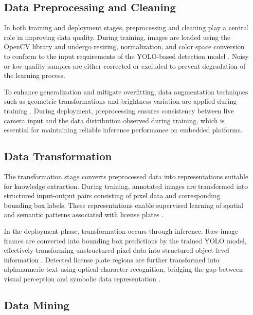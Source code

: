 \subsection{Data Preprocessing and Cleaning}

In both training and deployment stages, preprocessing and cleaning play a central role in improving data quality. During training, images are loaded using the OpenCV library and undergo resizing, normalization, and color space conversion to conform to the input requirements of the YOLO-based detection model \cite{bradski2000opencv,opencv_wiki}. Noisy or low-quality samples are either corrected or excluded to prevent degradation of the learning process.

To enhance generalization and mitigate overfitting, data augmentation techniques such as geometric transformations and brightness variation are applied during training \cite{shorten2019survey}. During deployment, preprocessing ensures consistency between live camera input and the data distribution observed during training, which is essential for maintaining reliable inference performance on embedded platforms.

\subsection{Data Transformation}

The transformation stage converts preprocessed data into representations suitable for knowledge extraction. During training, annotated images are transformed into structured input-output pairs consisting of pixel data and corresponding bounding box labels. These representations enable supervised learning of spatial and semantic patterns associated with license plates \cite{redmon2016you}.

In the deployment phase, transformation occurs through inference. Raw image frames are converted into bounding box predictions by the trained YOLO model, effectively transforming unstructured pixel data into structured object-level information \cite{bochkovskiy2020yolov4}. Detected license plate regions are further transformed into alphanumeric text using optical character recognition, bridging the gap between visual perception and symbolic data representation \cite{jaidedai2020easyocr}.

\subsection{Data Mining}

